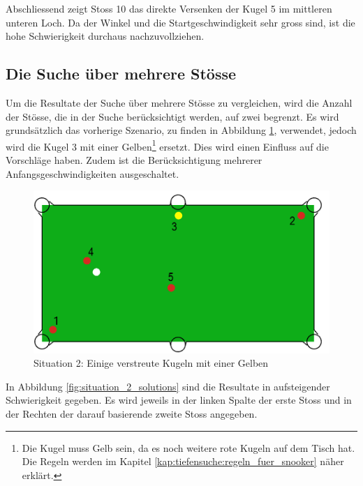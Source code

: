 Abschliessend zeigt Stoss 10 das direkte Versenken der Kugel 5 im mittleren unteren Loch.
Da der Winkel und die Startgeschwindigkeit sehr gross sind, ist die hohe Schwierigkeit durchaus nachzuvollziehen.

\subsection{Die Suche über mehrere Stösse}
Um die Resultate der Suche über mehrere Stösse zu vergleichen, wird die Anzahl der Stösse, die in der Suche
berücksichtigt werden, auf zwei begrenzt. Es wird grundsätzlich das vorherige Szenario, zu finden in Abbildung
\ref{fig:search_situation_2}, verwendet, jedoch wird die
Kugel 3 mit einer Gelben\footnote{Die Kugel muss Gelb sein, da es noch weitere rote Kugeln auf dem Tisch hat. Die
Regeln werden im Kapitel \ref{kap:tiefensuche:regeln_fuer_snooker} näher erklärt.} ersetzt. Dies wird
einen Einfluss auf die Vorschläge haben. Zudem ist die Berücksichtigung mehrerer Anfangsgeschwindigkeiten ausgeschaltet.

%
%
\begin{figure}[h!]
    \begin{center}
        \includegraphics[width=0.4\linewidth]{../common/04_results/resources/simple_search/situation_diverse_deep_search.PNG}
    \end{center}
    \caption{Situation 2: Einige verstreute Kugeln mit einer Gelben}
    \label{fig:search_situation_2}
\end{figure}

In Abbildung \ref{fig:situation_2_solutions} sind die Resultate in aufsteigender Schwierigkeit gegeben. Es wird
jeweils in der linken Spalte der erste Stoss und in der Rechten der darauf basierende zweite Stoss angegeben.

